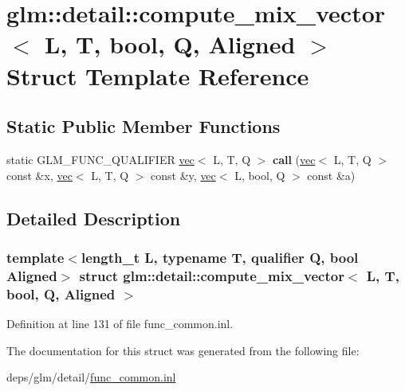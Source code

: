 \hypertarget{structglm_1_1detail_1_1compute__mix__vector_3_01L_00_01T_00_01bool_00_01Q_00_01Aligned_01_4}{}\section{glm\+:\+:detail\+:\+:compute\+\_\+mix\+\_\+vector$<$ L, T, bool, Q, Aligned $>$ Struct Template Reference}
\label{structglm_1_1detail_1_1compute__mix__vector_3_01L_00_01T_00_01bool_00_01Q_00_01Aligned_01_4}
\subsection*{Static Public Member Functions}
\begin{DoxyCompactItemize}
\item 
\mbox{\label{structglm_1_1detail_1_1compute__mix__vector_3_01L_00_01T_00_01bool_00_01Q_00_01Aligned_01_4_aec728ad35731e053c44ec1f31c28fe6b}} 
static G\+L\+M\+\_\+\+F\+U\+N\+C\+\_\+\+Q\+U\+A\+L\+I\+F\+I\+ER \hyperlink{structglm_1_1vec}{vec}$<$ L, T, Q $>$ {\bfseries call} (\hyperlink{structglm_1_1vec}{vec}$<$ L, T, Q $>$ const \&x, \hyperlink{structglm_1_1vec}{vec}$<$ L, T, Q $>$ const \&y, \hyperlink{structglm_1_1vec}{vec}$<$ L, bool, Q $>$ const \&a)
\end{DoxyCompactItemize}


\subsection{Detailed Description}
\subsubsection*{template$<$length\+\_\+t L, typename T, qualifier Q, bool Aligned$>$\newline
struct glm\+::detail\+::compute\+\_\+mix\+\_\+vector$<$ L, T, bool, Q, Aligned $>$}



Definition at line 131 of file func\+\_\+common.\+inl.



The documentation for this struct was generated from the following file\+:\begin{DoxyCompactItemize}
\item 
deps/glm/detail/\hyperlink{func__common_8inl}{func\+\_\+common.\+inl}\end{DoxyCompactItemize}

